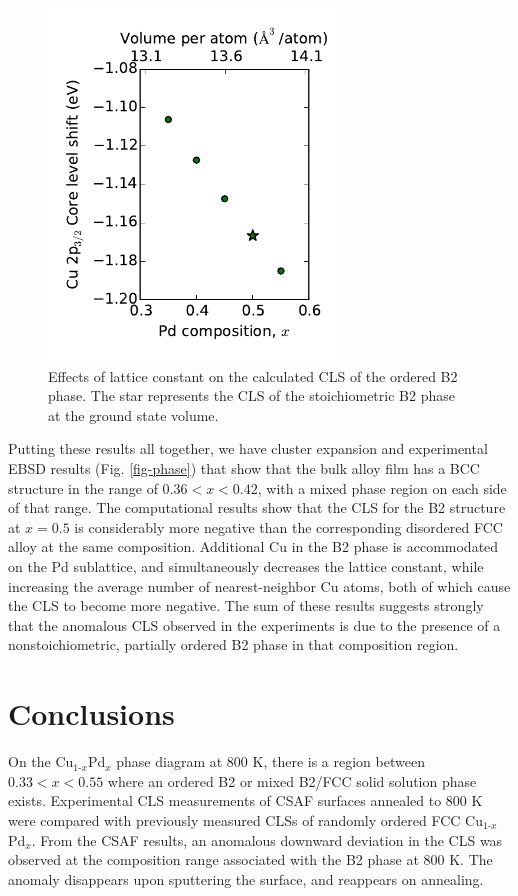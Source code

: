 \documentclass[number, sort&compress, review, 12pt]{elsarticle}
\begin{document}
\begin{figure}[H]
\centering
\includegraphics[width=3in]{strain}
\caption{\label{fig-clsvol}Effects of lattice constant on the calculated CLS of the ordered B2 phase. The star represents the CLS of the stoichiometric B2 phase at the ground state volume.}
\end{figure}

Putting these results all together, we have cluster expansion and experimental EBSD results (Fig. \ref{fig-phase}) that show that the bulk alloy film has a BCC structure in the range of $0.36 < x < 0.42$, with a mixed phase region on each side of that range. The computational results show that the CLS for the B2 structure at $x = 0.5$ is considerably more negative than the corresponding disordered FCC alloy at the same composition. Additional Cu in the B2 phase is accommodated on the Pd sublattice, and simultaneously decreases the lattice constant, while increasing the average number of nearest-neighbor Cu atoms, both of which cause the CLS to become more negative. The sum of these results suggests strongly that the anomalous CLS observed in the experiments is due to the presence of a nonstoichiometric, partially ordered B2 phase in that composition region.

\section{Conclusions}
\label{sec-4}
On the Cu$_{\text{1-}x}$Pd$_x$ phase diagram at 800 K, there is a region between $0.33 < x < 0.55$ where an ordered B2 or mixed B2/FCC solid solution phase exists. Experimental CLS measurements of CSAF surfaces annealed to 800 K were compared with previously measured CLSs of randomly ordered FCC Cu$_{\text{1-}x}$Pd$_x$. From the CSAF results, an anomalous downward deviation in the CLS was observed at the composition range associated with the B2 phase at 800 K. The anomaly disappears upon sputtering the surface, and reappears on annealing.
\end{document}
